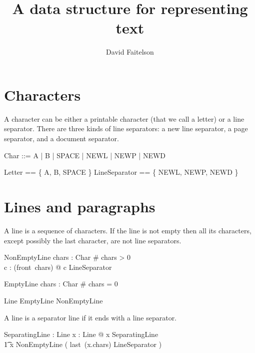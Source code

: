 \documentclass{article}
\title{A data structure for representing text}
\author{David Faitelson}
\begin{document}
\maketitle

\section{Characters} 

A character can be either a printable character (that we call
a letter) or a line separator. There are three kinds of line separators:
a new line separator, a page separator, and a document separator.

\begin{zed}
  Char ::= A | B | SPACE | NEWL | NEWP | NEWD 
\end{zed}

\begin{zed}
  Letter == \{ A, B, SPACE \} \also
  LineSeparator == \{ NEWL, NEWP, NEWD \}
\end{zed}

\section{Lines and paragraphs}

A line is a sequence of characters. If the line is not empty then all its characters, except possibly the last character, are not line separators.

\begin{schema}{NonEmptyLine}
  chars : \seq Char 
\where
  \# chars > 0 \\
  \forall c : \ran (front~chars) @ c \notin LineSeparator  
 \end{schema}

\begin{schema}{EmptyLine}
  chars : \seq Char 
\where
  \# chars = 0 \\
 \end{schema}

\begin{zed}
	Line  EmptyLine \lor NonEmptyLine
\end{zed} 
 
A line is a separator line if it ends with a line separator.
 
\begin{axdef}
   SeparatingLine : \power Line
   \where
   \forall x : Line @ x \in SeparatingLine \iff \\
   \t1 x \in NonEmptyLine \land ( last~(x.chars) \in LineSeparator )
\end{axdef}
\end{document}
